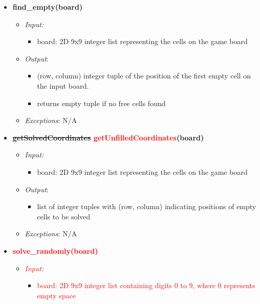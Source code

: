 \documentclass[11pt]{article}
\begin{document}
\begin{itemize}
	    \item \textbf{find\_empty(board)}
		\begin{itemize}
		    \item[] \textit{Input: } 
		    \begin{itemize}
		        \item board: 2D 9x9 integer list representing the cells on the game board
		    \end{itemize}	  
		    \item[] \textit{Output}: 
		    \begin{itemize}
		        \item (row, column) integer tuple of the position of the first empty cell on the input board.
		        \item returns empty tuple if no free cells found
		    \end{itemize}
		    \item[] \textit{Exceptions}:
		    N/A
		\end{itemize}
		
		\item \textbf{\sout{getSolvedCoordinates} \textcolor{red}{getUnfilledCoordinates}(board)}
		\begin{itemize}
		    \item[] \textit{Input: } 
		    \begin{itemize}
		        \item board: 2D 9x9 integer list representing the cells on the game board
		    \end{itemize}	  
		    \item[] \textit{Output}: 
		    \begin{itemize}
		        \item list of integer tuples with (row, column) indicating positions of empty cells to be solved
		    \end{itemize}
		    \item[] \textit{Exceptions}:
		    N/A
		\end{itemize}
		
		\item \textbf{\textcolor{red}{\textcolor{red}{solve\_randomly(board)}}}
		\begin{itemize}
		    \item[] \textit{\textcolor{red}{Input: }}
			\begin{itemize}
		        \item \textcolor{red}{board: 2D 9x9 integer list containing digits 0 to 9, where 0 represents empty space}
		    \end{itemize}	    
		    

\end{itemize}
\end{itemize}
\end{document}
